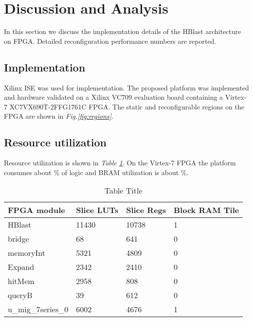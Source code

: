 \section{Discussion and Analysis}
\label{sec:discussion}

\quad In this section we discuss the implementation details of the HBlast architecture on FPGA. Detailed reconfiguration performance numbers are reported. 

\subsection{Implementation}
\quad Xilinx ISE was used for implementation. The proposed platform was implemented and hardware validated on a Xilinx VC709 evaluation board containing a Virtex-7 XC7VX690T-2FFG1761C FPGA. The static and reconfigurable regions on the FPGA are shown in \textit{Fig.\ref{fig:regions}}. 
\\
\subsection{Resource utilization}
Resource utilization is shown in \textit{Table \ref{tab:util}}. On the Virtex-7 FPGA the platform consumes about \% of logic and BRAM utilization is about \%.

\begin{table}[!t]
\caption {Table Title} \label{tab:util}
\begin{tabular}{l|l|l|l}
\hline
FPGA module        & Slice LUTs & Slice Regs & Block RAM Tile \\ \hline
HBlast             & 11430      & 10738      & 1              \\
bridge             & 68         & 641        & 0              \\
memoryInt          & 5321       & 4809       & 0              \\
Expand             & 2342       & 2410       & 0              \\
hitMem             & 2958       & 808        & 0              \\
queryB             & 39         & 612        & 0              \\
u\_mig\_7series\_0 & 6002       & 4676       & 1              \\ \hline

\end{tabular}
\end{table}



